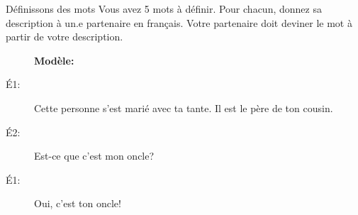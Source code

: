 \begin{frame}{Définissons des mots}
  Vous avez 5 mots à définir.
  Pour chacun, donnez sa description à un.e partenaire \alert{en français}.
  Votre partenaire doit deviner le mot à partir de votre description.
  \begin{description}
    \item[] \textbf{Modèle:} 
    \item[É1:] Cette personne s'est marié avec ta tante. Il est le père de ton cousin.
    \item[É2:] Est-ce que c'est mon oncle?
    \item[É1:] Oui, c'est ton oncle!
  \end{description}
\end{frame}